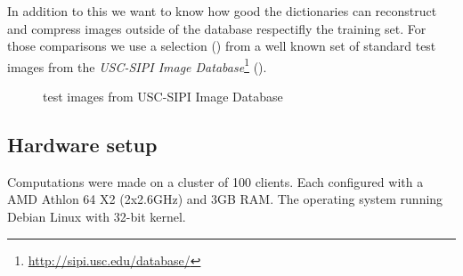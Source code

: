 In addition to this we want to know how good the dictionaries can reconstruct
and compress images outside of the database respectifly the training set. For
those comparisons we use a selection () from a
well known set of standard test images from the \emph{USC-SIPI Image
Database}\footnote{\url{http://sipi.usc.edu/database/}}
(). 
\begin{figure}[H]
\centering
\hspace{5mm}
\hspace{5mm}
\caption{test images from USC-SIPI Image Database}
\label{fig:USC-SIPI}
\end{figure}


\subsection{Hardware setup} 
Computations were made on a cluster of 100 clients. Each 
configured with a AMD Athlon 64 X2 (2x2.6GHz) and 3GB RAM.
The operating system running Debian Linux with 32-bit kernel. 




